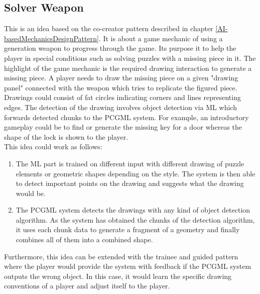 \documentclass[MGS,Master,english]{twbook}%
\begin{document}
\subsection{Solver Weapon} \label{idea::solverWeapon}
This is an idea based on the co-creator pattern described in chapter \ref{AI-basedMechanicsDesignPattern}. It is about a game mechanic of using a generation weapon to progress through the game. Its purpose it to help the player in special conditions such as solving puzzles with a missing piece in it. The highlight of the game mechanic is the required drawing interaction to generate a missing piece. A player needs to draw the missing piece on a given "drawing panel" connected with the weapon which tries to replicate the figured piece. Drawings could consist of fat circles indicating corners and lines representing edges. The detection of the drawing involves object detection via ML which forwards detected chunks to the PCGML system. For example, an introductory gameplay could be to find or generate the missing key for a door whereas the shape of the lock is shown to the player.\\
This idea could work as follows: 
\begin{enumerate}
	\item The ML part is trained on different input with different drawing of puzzle elements or geometric shapes depending on the style. The system is then able to detect important points on the drawing and suggests what the drawing would be.
	\item The PCGML system detects the drawings with any kind of object detection algorithm. As the system has obtained the chunks of the detection algorithm, it uses each chunk data to generate a fragment of a geometry and finally combines all of them into a combined shape.
\end{enumerate}
Furthermore, this idea can be extended with the trainee and guided pattern where the player would provide the system with feedback if the PCGML system outputs the wrong object. In this case, it would learn the specific drawing conventions of a player and adjust itself to the player.
\end{document}
